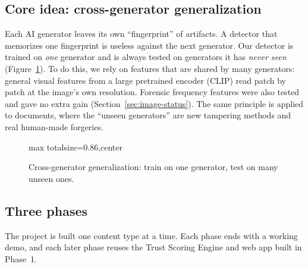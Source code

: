 \documentclass[11pt,a4paper]{article}
\newenvironment{diagram}{\begin{adjustbox}{max totalsize={\linewidth}{0.86\textheight},center}}{\end{adjustbox}}
\begin{document}
\subsection{Core idea: cross-generator generalization}
Each AI generator leaves its own ``fingerprint'' of artifacts. A detector that memorizes one
fingerprint is useless against the next generator. Our detector is trained on \emph{one}
generator and is always tested on generators it has \emph{never seen}
(Figure~\ref{fig:concept}). To do this, we rely on features that are shared by many generators:
general visual features from a large pretrained encoder (CLIP) read patch by patch at the image's own resolution. Forensic frequency features were also tested and
gave no extra gain (Section~\ref{sec:image-status}). The same principle is applied to
documents, where the ``unseen generators'' are new tampering methods and real human-made
forgeries.

\begin{figure}[htbp]
\centering
\begin{diagram}
\end{diagram}
\caption{Cross-generator generalization: train on one generator, test on many unseen ones.}
\label{fig:concept}
\end{figure}

\subsection{Three phases}
The project is built one content type at a time. Each phase ends with a working demo, and each
later phase reuses the Trust Scoring Engine and web app built in Phase~1.
\end{document}
